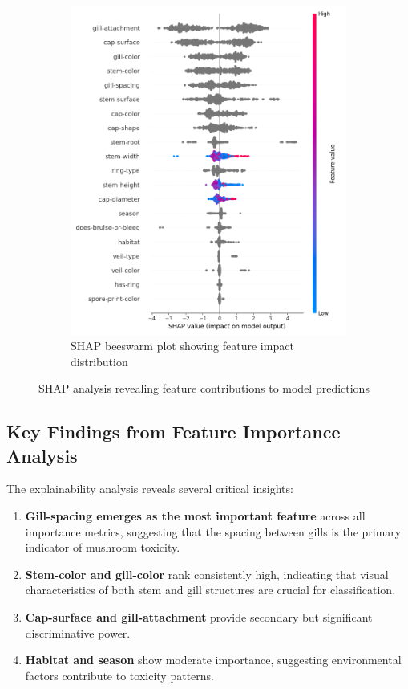 \documentclass[11pt,a4paper]{article}
\begin{document}
\begin{figure}[H]
\begin{subfigure}{0.48\textwidth}
        \includegraphics[width=\textwidth]{figures/shap_beeswarm.png}
        \caption{SHAP beeswarm plot showing feature impact distribution}
    \end{subfigure}
    \caption{SHAP analysis revealing feature contributions to model predictions}
    \label{fig:shap_analysis}
\end{figure}

\subsection{Key Findings from Feature Importance Analysis}

The explainability analysis reveals several critical insights:

\begin{enumerate}
    \item \textbf{Gill-spacing emerges as the most important feature} across all importance metrics, suggesting that the spacing between gills is the primary indicator of mushroom toxicity.
    \item \textbf{Stem-color and gill-color} rank consistently high, indicating that visual characteristics of both stem and gill structures are crucial for classification.
    \item \textbf{Cap-surface and gill-attachment} provide secondary but significant discriminative power.
    \item \textbf{Habitat and season} show moderate importance, suggesting environmental factors contribute to toxicity patterns.
\end{enumerate}
\end{document}
